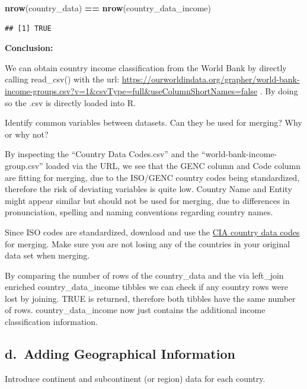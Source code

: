 \documentclass[
]{article}
\newenvironment{Shaded}{\begin{snugshade}}{\end{snugshade}}
\newcommand{\FunctionTok}[1]{\textcolor[rgb]{0.13,0.29,0.53}{\textbf{#1}}}
\newcommand{\NormalTok}[1]{#1}
\newcommand{\SpecialCharTok}[1]{\textcolor[rgb]{0.81,0.36,0.00}{\textbf{#1}}}
\begin{document}
\begin{Shaded}
\begin{Highlighting}[]
\FunctionTok{nrow}\NormalTok{(country\_data) }\SpecialCharTok{==} \FunctionTok{nrow}\NormalTok{(country\_data\_income)}
\end{Highlighting}
\end{Shaded}

\begin{verbatim}
## [1] TRUE
\end{verbatim}

\textbf{Conclusion:}

We can obtain country income classification from the World Bank by
directly calling read\_csv() with the url:
\url{https://ourworldindata.org/grapher/world-bank-income-groups.csv?v=1&csvType=full&useColumnShortNames=false}
. By doing so the .csv is directly loaded into R.

Identify common variables between datasets. Can they be used for
merging? Why or why not?

By inspecting the ``Country Data Codes.csv'' and the
``world-bank-income-group.csv'' loaded via the URL, we see that the GENC
column and Code column are fitting for merging, due to the ISO/GENC
country codes being standardized, therefore the risk of deviating
variables is quite low. Country Name and Entity might appear similar but
should not be used for merging, due to differences in pronunciation,
spelling and naming conventions regarding country names.

Since ISO codes are standardized, download and use the
\href{https://www.cia.gov/the-world-factbook/references/country-data-codes/}{CIA
country data codes} for merging. Make sure you are not losing any of the
countries in your original data set when merging.

By comparing the number of rows of the country\_data and the via
left\_join enriched country\_data\_income tibbles we can check if any
country rows were lost by joining. TRUE is returned, therefore both
tibbles have the same number of rows. country\_data\_income now just
contains the additional income classification information.

\subsection{d.~Adding Geographical
Information}\label{d.-adding-geographical-information}

Introduce continent and subcontinent (or region) data for each country.
\end{document}
